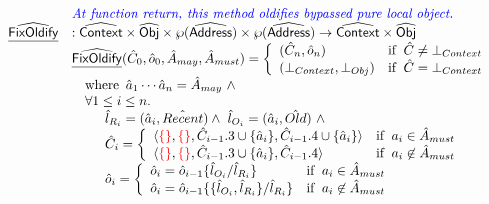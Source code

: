\[\begin{array}{ll}
& {\color{blue} \textit{At function return, this method oldifies bypassed pure local object.}} \\
\widehat{\underline{\sf FixOldify}} & : \widehat{\mbox{\textsf{Context}}} \times \widehat{\mbox{\textsf{Obj}}} \times \wp(\widehat{\mbox{\textsf{Address}}}) \times \wp(\widehat{\mbox{\textsf{Address}}}) \rightarrow \widehat{\mbox{\textsf{Context}}} \times \widehat{\mbox{\textsf{Obj}}} \\
& \widehat{\underline{\sf FixOldify}}(\hat{C}_0, \hat{o}_0, \hat{A}_{may}, \hat{A}_{must}) =
    \left\{
      \begin{array}{ll}
        (\hat{C}_n, \hat{o}_n) & {\rm if}\begin{array}[t]{l}\hat{C} \neq \bot_{Context}\end{array} \\
        (\bot_{Context}, \bot_{Obj}) & {\rm if}\begin{array}[t]{l}\hat{C} = \bot_{Context}\end{array} \\
      \end{array}
    \right.\\
& \quad{\rm where}\begin{array}[t]{l}\hat{a}_1\cdots\hat{a}_n = \hat{A}_{may} ~ \land\end{array} \\
& \quad\forall 1 \leq i \leq n.\\
& \quad\quad \begin{array}{l}
    \hat{l}_{R_i} = (\hat{a}_i, \hat{Recent}) \land\ \hat{l}_{O_i} = (\hat{a}_i, \hat{Old})\ \land \\
    \hat{C}_i = 
    \left\{\begin{array}{ll}
      \langle {\color{red}\{ \}},
              {\color{red} \{ \}},
              \hat{C}_{i-1}.3 \cup \{\hat{a}_i\},
              \hat{C}_{i-1}.4 \cup \{\hat{a}_i\}
      \rangle & {\rm if}\begin{array}[t]{l}a_i \in \hat{A}_{must}\end{array} \\
      \langle {\color{red}\{ \}},
              {\color{red} \{ \}},
              \hat{C}_{i-1}.3 \cup \{\hat{a}_i\},
              \hat{C}_{i-1}.4 
      \rangle & {\rm if}\begin{array}[t]{l}a_i \not\in \hat{A}_{must}\end{array} \\
    \end{array}\right. \\
    \hat{o}_i = 
    \left\{\begin{array}{ll}
      \hat{o}_i = \hat{o}_{i-1}\{\hat{l}_{O_i} / \hat{l}_{R_i} \} & {\rm if}\begin{array}[t]{l}a_i \in \hat{A}_{must}\end{array} \\
      \hat{o}_i = \hat{o}_{i-1}\{\{\hat{l}_{O_i}, \hat{l}_{R_i}\} / \hat{l}_{R_i} \} & {\rm if}\begin{array}[t]{l}a_i \not\in \hat{A}_{must}\end{array}
    \end{array}\right. \\
  \end{array}
\\
\\


\end{array}\]
